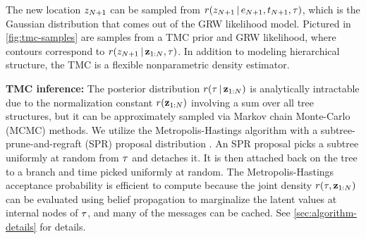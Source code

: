 The new location $z_{N + 1}$ can be sampled from  $r(z_{N + 1} \,|\, e_{N + 1}, t_{N + 1}, \tau)$, which is
the Gaussian distribution that comes out of the GRW likelihood model.
Pictured in \autoref{fig:tmc-samples} are samples from a TMC prior and GRW likelihood, where contours correspond to $r(z_{N + 1} \,|\, \mathbf{z}_{1:N}, \tau)$.
In addition to modeling hierarchical structure, the TMC is a flexible nonparametric density estimator.

\textbf{TMC inference:}
The posterior distribution $r(\tau \,|\, \mathbf{z}_{1:N})$
is analytically intractable due to the normalization constant
$r(\mathbf{z}_{1:N})$ involving a sum over all tree structures,
but it can be approximately sampled via Markov chain Monte-Carlo (MCMC) methods.
We utilize the Metropolis-Hastings
algorithm with a subtree-prune-and-regraft (SPR)
proposal distribution \citep{Neal2003}. An SPR proposal
picks a subtree uniformly at random from $\tau$
and detaches it.
It is then attached back on the tree
to a branch and time picked uniformly at random.
The Metropolis-Hastings acceptance probability is efficient to compute because the joint density $r(\tau, \mathbf{z}_{1:N})$ can be evaluated using belief propagation to marginalize the latent values at internal nodes of $\tau$, and many of the messages can be cached.
See \autoref{sec:algorithm-details} for details.

